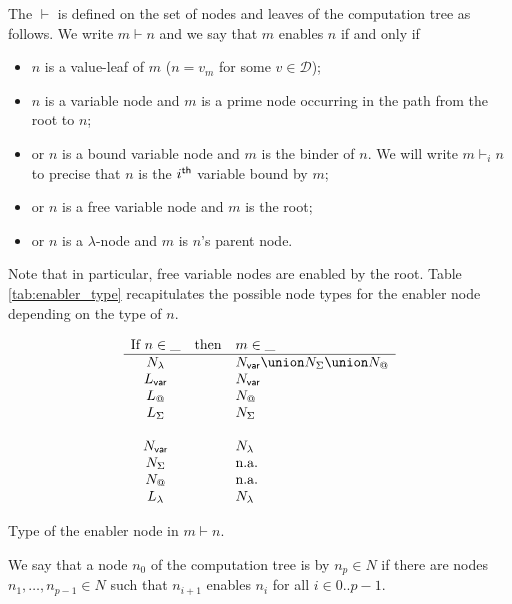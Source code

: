 \begin{definition}[Enabling]
The  $\vdash$ is defined on the set of
nodes and leaves of the computation tree as follows. We write $m \vdash n$ and
we say that $m$ enables $n$ if and only if
\begin{itemize}
\item $n$ is a value-leaf of $m$ ($n=v_m$ for some $v\in\mathcal{D}$);
\item $n$ is a variable node and $m$ is a prime node occurring in the path from the root to $n$;
\item or $n$ is a bound variable node and $m$ is the binder of $n$. We will write $m \vdash_i n$ to precise that $n$
is the $i^{\sf th}$ variable bound by $m$;
\item or $n$ is a free variable node and $m$ is the root;
\item or $n$ is a $\lambda$-node and $m$ is $n$'s parent node.
\end{itemize}
Note that in particular, free variable nodes are enabled by the root.
Table \ref{tab:enabler_type} recapitulates the possible node types for the enabler node 
depending on the type of $n$.
\end{definition}


\begin{table}[htbp]
$$
\begin{array}{ccl}
\mbox{If } n\in \_  & \mbox{then} & m\in \_ \\ \hline
N_\lambda & & N_{\sf var} \union N_\Sigma \union N_@ \\
L_{\sf var} & & N_{\sf var} \\
L_@ & &  N_@ \\
L_\Sigma & & N_\Sigma\\
\\
N_{\sf var} & & N_\lambda\\
N_\Sigma & & \mbox{n.a.} \\
N_@ & & \mbox{n.a.} \\
L_\lambda & & N_\lambda\\
\end{array}
$$
\caption[Type of the justifying node]{Type of the enabler node in $m\vdash n$.}
\label{tab:enabler_type}
\end{table}

We say that a node $n_0$ of the computation tree is  by $n_p \in N$ if there are nodes $n_1,\ldots, n_{p-1} \in N$ such that $n_{i+1}$ enables $n_{i}$
for all $i\in 0..p-1$.

